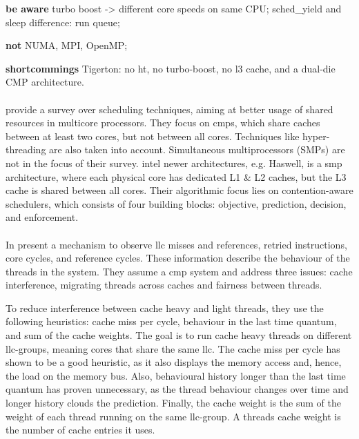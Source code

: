 \textbf{be aware} turbo boost -> different core speeds on same CPU;
sched\_yield and sleep difference: run queue;

\textbf{not} NUMA, MPI, OpenMP;

\textbf{shortcommings} Tigerton: no \gls{ht}, no turbo-boost, no l3 cache,
and a dual-die CMP architecture.


\paragraph{ \cite{zhuravlev_survey_2012} }
\citeauthor{zhuravlev_survey_2012} provide a survey over scheduling techniques,
aiming at better usage of shared resources in multicore processors.
They focus on \gls{cmp}s, which share caches between at
least two cores, but not between all cores.
Techniques like hyper-threading are also taken into account.
Simultaneous multiprocessors (SMPs) are not in the focus of their survey.
\gls{intel} newer architectures, e.g. Haswell, is a \gls{smp} architecture, where each
physical core has dedicated L1 \& L2 caches, but the L3 cache is shared between
all cores.
Their algorithmic focus lies on contention-aware schedulers, which consists of
four building blocks: objective, prediction, decision, and enforcement.


\paragraph{ \cite{knauerhase_using_2008} }
In  \citeauthor{knauerhase_using_2008} present
a mechanism to observe \gls{llc} misses and references, retried instructions,
core cycles, and reference cycles.
These information describe the behaviour of the threads in the system.
They assume a \gls{cmp} system and address three issues: cache interference,
migrating threads across caches and fairness between threads.

To reduce interference between cache heavy and light threads, they use the
following heuristics: cache miss per cycle, behaviour in the last time quantum,
and sum of the cache weights.
The goal is to run cache heavy threads on different \gls{llc}-groups, meaning
cores that share the same \gls{llc}.
The cache miss per cycle has shown to be a good heuristic, as it also displays
the memory access and, hence, the load on the memory bus.
Also, behavioural history longer than the last time quantum has proven
unnecessary, as the thread behaviour changes over time and longer history
clouds the prediction.
Finally, the cache weight is the sum of the weight of each thread running on
the same \gls{llc}-group.
A threads cache weight is the number of cache entries it uses. 

